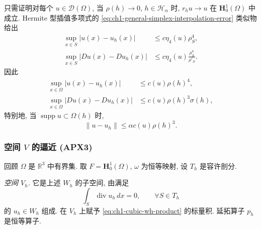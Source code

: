 \begin{Proof}
只需证明对每个 $u\in\mathcal D(\Omega)$, 当 $\rho(h)\to0$,
$h\in\mathcal H_\alpha$ 时, $r_hu\to u$ 在 $\mathbf H_0^1(\Omega)$ 中成立. Hermite 型插值多项式的 \eqref{eq:ch1-general-simplex-interpolation-error} 类似物给出
\begin{equation}
\begin{aligned}
\sup_{x\in S}|u(x)-u_h(x)|&\leq c\eta_4(u)\rho_S^4,\\
\sup_{x\in S}|Du(x)-Du_h(x)|
&\leq c\eta_4(u)\frac{\rho_S^4}{\rho'_S}.
\end{aligned}
\label{eq:ch1-cubic-local-error}
\end{equation}
因此
\begin{equation}
\begin{aligned}
\sup_{x\in\Omega}|u(x)-u_h(x)|
&\leq c(u)\rho(h)^4,\\
\sup_{x\in\Omega}|Du(x)-Du_h(x)|
&\leq c(u)\rho(h)^3\sigma(h),
\end{aligned}
\label{eq:ch1-cubic-global-error}
\end{equation}
特别地, 当 $\operatorname{supp}u\subset\Omega(h)$ 时,
\begin{equation}
\|u-u_h\|\leq\alpha c(u)\rho(h)^3.
\label{eq:ch1-cubic-h1-error}
\end{equation}
\end{Proof}

\subsubsection*{空间 $V$ 的逼近 (APX3)}

回顾 $\Omega$ 是 $\mathbb R^3$ 中有界集. 取
$F=\mathbf H_0^1(\Omega)$, $\omega$ 为恒等映射, 设 $T_h$ 是容许剖分.

\emph{空间 $V_h$.} 它是上述 $W_h$ 的子空间, 由满足
\begin{equation}
\int_S\operatorname{div}u_h\,dx=0,
\qquad\forall S\in T_h
\label{eq:ch1-apx3-discrete-divergence}
\end{equation}
的 $u_h\in W_h$ 组成. 在 $V_h$ 上赋予
\eqref{eq:ch1-cubic-wh-product} 的标量积. 延拓算子 $p_h$ 是恒等算子.

